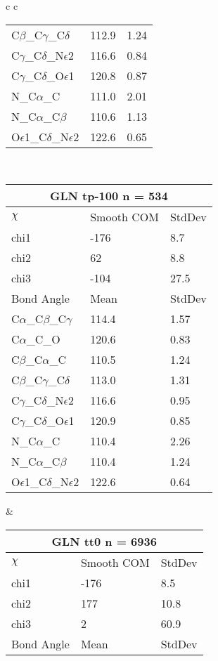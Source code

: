 \begin{longtable}{ c c }
\begin{tabular}{ l l l }
  C$\beta$\_C$\gamma$\_C$\delta$ & 112.9 & 1.24\\
  C$\gamma$\_C$\delta$\_N$\epsilon$2 & 116.6 & 0.84\\
  C$\gamma$\_C$\delta$\_O$\epsilon$1 & 120.8 & 0.87\\
  N\_C$\alpha$\_C & 111.0 & 2.01\\
  N\_C$\alpha$\_C$\beta$ & 110.6 & 1.13\\
  O$\epsilon$1\_C$\delta$\_N$\epsilon$2 & 122.6 & 0.65\\
  \bottomrule
  \end{tabular}
  \\
  \begin{tabular}{ l l l }
  \toprule
  \multicolumn{3}{c}{GLN \textbf{tp-100} n = 534} \\ \toprule
  $\chi$       & Smooth COM & StdDev \\ \midrule
  chi1 & -176 & 8.7 \\ 
  chi2 & 62 & 8.8 \\ 
  chi3 & -104 & 27.5 \\ \midrule
  Bond Angle   & Mean     & StdDev \\ \midrule
  C$\alpha$\_C$\beta$\_C$\gamma$ & 114.4 & 1.57\\
  C$\alpha$\_C\_O & 120.6 & 0.83\\
  C$\beta$\_C$\alpha$\_C & 110.5 & 1.24\\
  C$\beta$\_C$\gamma$\_C$\delta$ & 113.0 & 1.31\\
  C$\gamma$\_C$\delta$\_N$\epsilon$2 & 116.6 & 0.95\\
  C$\gamma$\_C$\delta$\_O$\epsilon$1 & 120.9 & 0.85\\
  N\_C$\alpha$\_C & 110.4 & 2.26\\
  N\_C$\alpha$\_C$\beta$ & 110.4 & 1.24\\
  O$\epsilon$1\_C$\delta$\_N$\epsilon$2 & 122.6 & 0.64\\
  \bottomrule
  \end{tabular}
  &
  \begin{tabular}{ l l l }
  \toprule
  \multicolumn{3}{c}{GLN \textbf{tt0} n = 6936} \\ \toprule
  $\chi$       & Smooth COM & StdDev \\ \midrule
  chi1 & -176 & 8.5 \\ 
  chi2 & 177 & 10.8 \\ 
  chi3 & 2 & 60.9 \\ \midrule
  Bond Angle   & Mean     & StdDev \\ \midrule

\end{tabular}
\end{longtable}
